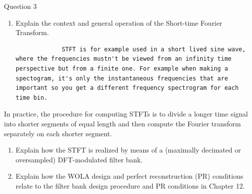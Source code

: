 \documentclass[
  a4paper,
  ,captions=tableheading
]{scrartcl}
\providecommand{\tightlist}{%
  \setlength{\itemsep}{0pt}\setlength{\parskip}{0pt}}
\begin{document}
Question 3

\begin{enumerate}
\def\labelenumi{\arabic{enumi}.}
\item
  Explain the context and general operation of the Short-time Fourier
  Transform.

\begin{lstlisting}
             STFT is for example used in a short lived sine wave, where the frequencies mustn't be viewed from an infinity time perspective but from a finite one. For example when making a spectogram, it's only the instantaneous frequencies that are important so you get a different frequency spectrogram for each time bin. 
\end{lstlisting}
\end{enumerate}

In practice, the procedure for computing STFTs is to divide a longer
time signal into shorter segments of equal length and then compute the
Fourier transform separately on each shorter segment.

\begin{enumerate}
\def\labelenumi{\arabic{enumi}.}
\setcounter{enumi}{1}
\tightlist
\item
  Explain how the STFT is realized by means of a (maximally decimated or
  oversampled) DFT-modulated filter bank.\\
\item
  Explain how the WOLA design and perfect reconstruction (PR) conditions
  relate to the filter bank design procedure and PR conditions in
  Chapter 12.
\end{enumerate}

\subsubsection{}\label{section-17}

\subsubsection{}\label{section-18}

\subsubsection{}\label{section-19}

\subsubsection{}\label{section-20}
\end{document}
